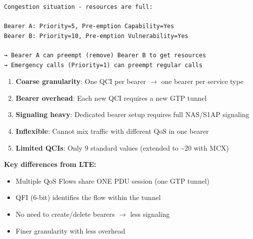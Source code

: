 \begin{CNplaincode}
\begin{Verbatim}
Congestion situation - resources are full:

Bearer A: Priority=5, Pre-emption Capability=Yes
Bearer B: Priority=10, Pre-emption Vulnerability=Yes

→ Bearer A can preempt (remove) Bearer B to get resources
→ Emergency calls (Priority=1) can preempt regular calls
\end{Verbatim}
\end{CNplaincode}





\begin{enumerate}
\def\labelenumi{\arabic{enumi}.}
\tightlist
\item
  \textbf{Coarse granularity}: One QCI per bearer \ensuremath{\to} one bearer per service type
\item
  \textbf{Bearer overhead}: Each new QCI requires a new GTP tunnel
\item
  \textbf{Signaling heavy}: Dedicated bearer setup requires full NAS/\allowbreak{}S1AP signaling
\item
  \textbf{Inflexible}: Cannot mix traffic with different QoS in one bearer
\item
  \textbf{Limited QCIs}: Only 9 standard values (extended to \textasciitilde{}20 with MCX)
\end{enumerate}




\CNchained{}


\textbf{Key differences from LTE:}

\begin{itemize}
\tightlist
\item
  Multiple QoS Flows share ONE PDU session (one GTP tunnel)
\item
  QFI (6-bit) identifies the flow within the tunnel
\item
  No need to create/\allowbreak{}delete bearers \ensuremath{\to} less signaling
\item
  Finer granularity with less overhead
\end{itemize}

